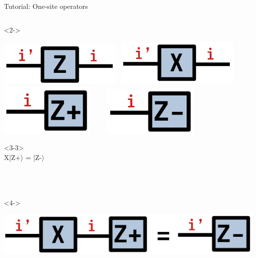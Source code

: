 \begin{frame}[fragile]{Tutorial: One-site operators}
\begin{columns}
\begin{column}{4.5cm}
\begin{onlyenv}<2->
\begin{center}
\includegraphics[width=0.45\textwidth]{
  slides/assets/Z.png
} \
\includegraphics[width=0.45\textwidth]{
  slides/assets/X.png
} \\
\vspace*{0.5cm}
\includegraphics[width=0.35\textwidth]{
  slides/assets/Zp.png
} \ \ \ \ 
\includegraphics[width=0.35\textwidth]{
  slides/assets/Zm.png
}
\end{center}
\vspace*{0.1cm}
\end{onlyenv}

\begin{onlyenv}<3-3>
~\\
X|Z+$\rangle$ = |Z-$\rangle$ \\
~\\
~\\
~\\
\end{onlyenv}

\begin{onlyenv}<4->
\vspace*{0.3cm}
\begin{center}
\includegraphics[width=1.0\textwidth]{
  slides/assets/XZp.png
}
\end{center}
\vspace*{0.2cm}
\end{onlyenv}

\end{column}

\end{columns}

\end{frame}
